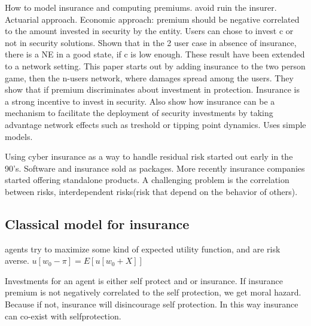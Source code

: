 How to model insurance and computing premiums. avoid ruin the insurer. Actuarial approach.
 Economic approach:  premium should be negative correlated to the amount
invested in security by the entity. Users can chose to invest c or not in security
solutions. Shown that in the 2 user case in absence of insurance, there is a NE
in a good state, if c is low enough. These result have been extended to a
network setting. This paper starts out by adding insurance to the two person game,
 then the n-users network, where damages spread among the users. 
 They show that if premium discriminates about investment in protection.
  Insurance is a strong incentive to invest in security.
   Also show how insurance can be a mechanism to facilitate the deployment of security
    investments by taking advantage network effects such as treshold or tipping point dynamics. 
    Uses simple models. 

Using cyber insurance as a way to handle residual risk started out early in the 90's. 
Software and insurance sold as packages. 
 More recently insurance companies started offering standalone products.
  A challenging problem is the correlation between risks, interdependent risks(risk that depend on the behavior of others).

\subsection{Classical model for insurance}
agents try to maximize some kind of expected utility function, and are risk averse.
$u[w_{0}-\pi]=E[u[w_{0}+X]]$

Investments for an agent is either self protect and or insurance.
If insurance premium is not negatively correlated to the self protection, we get moral hazard. Because if not, insurance will disincourage self protection.
In this way insurance can co-exist with selfprotection.
